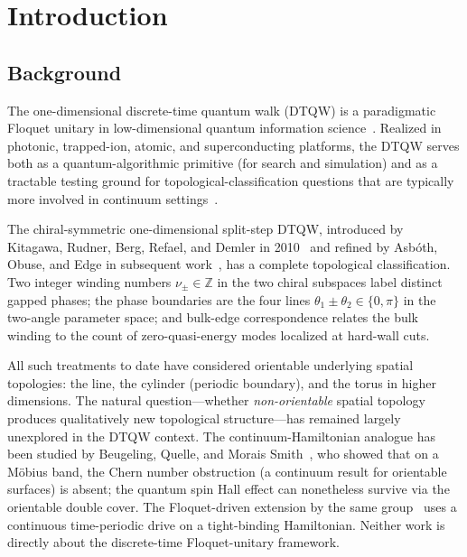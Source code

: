 \documentclass[aps,pra,reprint,amsmath,amssymb,superscriptaddress,nofootinbib,longbibliography]{revtex4-2}
\newcommand{\Z}{\mathbb{Z}}
\begin{document}
\maketitle


\section{Introduction}
\label{sec:intro}

\subsection{Background}

The one-dimensional discrete-time quantum walk (DTQW) is a paradigmatic Floquet unitary in low-dimensional quantum information science~\cite{kitagawa2010,asbothObuse2013,asbothEdge2015,cedzich2018,rakovszky2015}. Realized in photonic, trapped-ion, atomic, and superconducting platforms, the DTQW serves both as a quantum-algorithmic primitive (for search and simulation) and as a tractable testing ground for topological-classification questions that are typically more involved in continuum settings~\cite{rudner2013,higashikawa2019}.

The chiral-symmetric one-dimensional split-step DTQW, introduced by Kitagawa, Rudner, Berg, Refael, and Demler in 2010~\cite{kitagawa2010} and refined by Asb\'oth, Obuse, and Edge in subsequent work~\cite{asbothObuse2013,asbothEdge2015}, has a complete topological classification. Two integer winding numbers $\nu_\pm \in \Z$ in the two chiral subspaces label distinct gapped phases; the phase boundaries are the four lines $\theta_1 \pm \theta_2 \in \{0, \pi\}$ in the two-angle parameter space; and bulk-edge correspondence relates the bulk winding to the count of zero-quasi-energy modes localized at hard-wall cuts.

All such treatments to date have considered orientable underlying spatial topologies: the line, the cylinder (periodic boundary), and the torus in higher dimensions. The natural question---whether \emph{non-orientable} spatial topology produces qualitatively new topological structure---has remained largely unexplored in the DTQW context. The continuum-Hamiltonian analogue has been studied by Beugeling, Quelle, and Morais Smith~\cite{beugeling2014,quelle2014}, who showed that on a M\"obius band, the Chern number obstruction (a continuum result for orientable surfaces) is absent; the quantum spin Hall effect can nonetheless survive via the orientable double cover. The Floquet-driven extension by the same group~\cite{quelle2014} uses a continuous time-periodic drive on a tight-binding Hamiltonian. Neither work is directly about the discrete-time Floquet-unitary framework.
\end{document}
